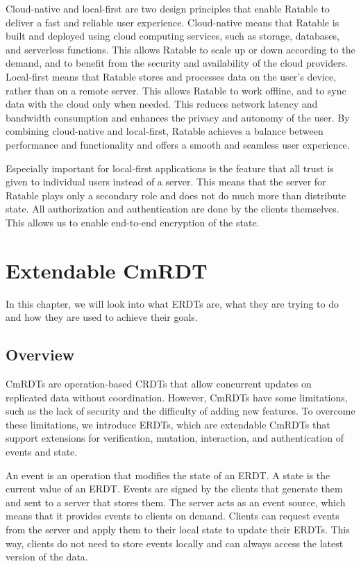 \documentclass[
	english,
	ruledheaders=section,   %
	class=report,		    %
	thesis={type=bachelor}, %
	accentcolor=9c,			%
	custommargins=true,    %
	marginpar=false,        %
	parskip=half-,          %
	fontsize=11pt,          %
]{tudapub}
\begin{document}
Cloud-native and local-first are two design principles that enable Ratable to deliver a fast and reliable user experience. Cloud-native means that Ratable is built and deployed using cloud computing services, such as storage, databases, and serverless functions. This allows Ratable to scale up or down according to the demand, and to benefit from the security and availability of the cloud providers. Local-first means that Ratable stores and processes data on the user’s device, rather than on a remote server. This allows Ratable to work offline, and to sync data with the cloud only when needed. This reduces network latency and bandwidth consumption and enhances the privacy and autonomy of the user. By combining cloud-native and local-first, Ratable achieves a balance between performance and functionality and offers a smooth and seamless user experience.

Especially important for local-first applications is the feature that all trust is given to individual users instead of a server. This means that the server for Ratable plays only a secondary role and does not do much more than distribute state. All authorization and authentication are done by the clients themselves. This allows us to enable end-to-end encryption of the state.

\chapter{Extendable CmRDT}
In this chapter, we will look into what ERDTs are, what they are trying to do and how they are used to achieve their goals.

\section{Overview}
CmRDTs are operation-based CRDTs that allow concurrent updates on replicated data without coordination. However, CmRDTs have some limitations, such as the lack of security and the difficulty of adding new features. To overcome these limitations, we introduce ERDTs, which are extendable CmRDTs that support extensions for verification, mutation, interaction, and authentication of events and state.

An event is an operation that modifies the state of an ERDT. A state is the current value of an ERDT. Events are signed by the clients that generate them and sent to a server that stores them. The server acts as an event source, which means that it provides events to clients on demand. Clients can request events from the server and apply them to their local state to update their ERDTs. This way, clients do not need to store events locally and can always access the latest version of the data.
\end{document}
